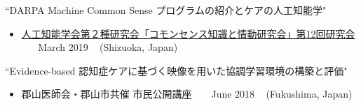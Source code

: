 \begin{talks}
	\talk
	{``DARPA Machine Common Sense プログラムの紹介とケアの人工知能学"}
	{
	\begin{itemize}[leftmargin=.4in]
	    \item \href{http://sig-cse.jp/}{人工知能学会第２種研究会「コモンセンス知識と情動研究会」第12回研究会} ~ \lbrack\href{http://sig-cse.jp/schedule.html\#190313}{\small{\websiteSymbol}}\rbrack ~
	    \hfill March 2019 ~ (Shizuoka, Japan)
	\end{itemize}
	}

	\talk
	{``Evidence-based 認知症ケアに基づく映像を用いた協調学習環境の構築と評価"}
	{
	\begin{itemize}[leftmargin=.4in]
	    \item 郡山医師会・郡山市共催 市民公開講座 ~ \lbrack\href{http://bigheart-hp.net/gyoji-2018.html}{\small{\websiteSymbol}}\rbrack ~
	    \hfill June 2018 ~ (Fukushima, Japan)
	\end{itemize}
	}
\end{talks}
\vspace{-3mm}

